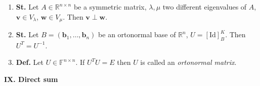 \documentclass{article}
\newcommand{\<}{\left<}
\renewcommand{\>}{\right>}
\newcommand{\Id}{\text{Id}}
\newcommand{\R}{\mathbb{R}}
\newcommand{\F}{\mathbb{F}}
\newcommand{\define}{\textbf{Def. }}
\newcommand{\state}{\textbf{St. }}
\begin{document}
\begin{multicols}{3}
\begin{enumerate}[itemsep=2pt, topsep=2pt, partopsep=2pt, parsep=2pt]
        \item \state Let $A\in\R^{n\times n}$ be a symmetric matrix, $\lambda,\mu$ two different eigenvalues of $A$, $\bm v\in V_\lambda$, $\bm w\in V_\mu$. Then $\bm v\perp\bm w$.
        \item \state Let $B=\left(\bm b_1,\ldots,\bm b_n\right)$ be an ortonormal base of $\R^n$, $U=\left[\Id\right]_B^K$. Then $U^T=U^{-1}$.
        \item \define Let $U\in\F^{n\times n}$. If $U^TU=E$ then $U$ is called an \emph{ortonormal matrix}.

    \end{enumerate}

    \textbf{IX. Direct sum}

    \begin{enumerate}[itemsep=2pt, topsep=2pt, partopsep=2pt, parsep=2pt]


\end{enumerate}
\end{multicols}
\end{document}
